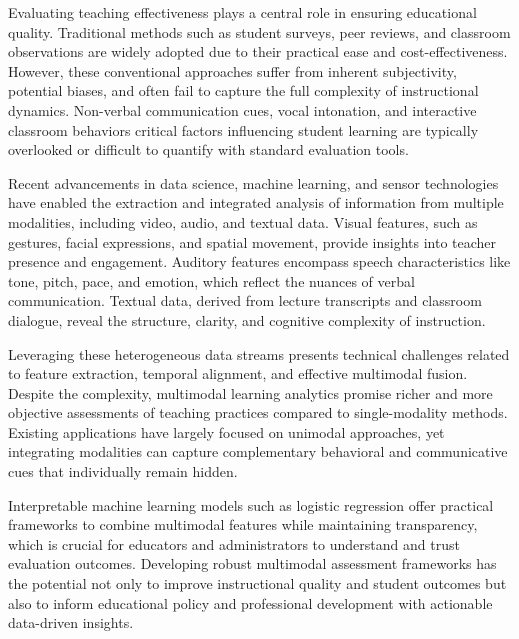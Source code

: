 Evaluating teaching effectiveness plays a central role in ensuring educational quality. Traditional methods such as student surveys, peer reviews, and classroom observations are widely adopted due to their practical ease and cost-effectiveness. However, these conventional approaches suffer from inherent subjectivity, potential biases, and often fail to capture the full complexity of instructional dynamics. Non-verbal communication cues, vocal intonation, and interactive classroom behaviors critical factors influencing student learning are typically overlooked or difficult to quantify with standard evaluation tools.

Recent advancements in data science, machine learning, and sensor technologies have enabled the extraction and integrated analysis of information from multiple modalities, including video, audio, and textual data. Visual features, such as gestures, facial expressions, and spatial movement, provide insights into teacher presence and engagement. Auditory features encompass speech characteristics like tone, pitch, pace, and emotion, which reflect the nuances of verbal communication. Textual data, derived from lecture transcripts and classroom dialogue, reveal the structure, clarity, and cognitive complexity of instruction.

Leveraging these heterogeneous data streams presents technical challenges related to feature extraction, temporal alignment, and effective multimodal fusion. Despite the complexity, multimodal learning analytics promise richer and more objective assessments of teaching practices compared to single-modality methods. Existing applications have largely focused on unimodal approaches, yet integrating modalities can capture complementary behavioral and communicative cues that individually remain hidden.

Interpretable machine learning models such as logistic regression offer practical frameworks to combine multimodal features while maintaining transparency, which is crucial for educators and administrators to understand and trust evaluation outcomes. Developing robust multimodal assessment frameworks has the potential not only to improve instructional quality and student outcomes but also to inform educational policy and professional development with actionable data-driven insights.